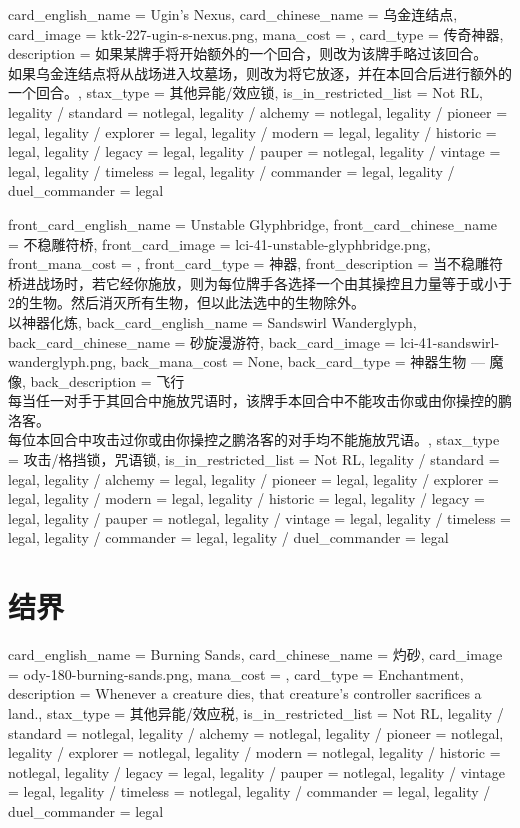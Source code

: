\documentclass[lang = cn, color = black, 10pt]{AllThatStax}
\begin{document}
\card
{
	card_english_name = {Ugin's Nexus},
	card_chinese_name = {乌金连结点},
	card_image = ktk-227-ugin-s-nexus.png,
	mana_cost = ,
	card_type = 传奇神器,
	description = {如果某牌手将开始额外的一个回合，则改为该牌手略过该回合。\\
		如果乌金连结点将从战场进入坟墓场，则改为将它放逐，并在本回合后进行额外的一个回合。},
	stax_type = 其他异能/效应锁,
	is_in_restricted_list = Not RL,
	legality / standard = notlegal,
	legality / alchemy = notlegal,
	legality / pioneer = legal,
	legality / explorer = legal,
	legality / modern = legal,
	legality / historic = legal,
	legality / legacy = legal,
	legality / pauper = notlegal,
	legality / vintage = legal,
	legality / timeless = legal,
	legality / commander = legal,
	legality / duel_commander = legal
}

\mfcard
{
	front_card_english_name = {Unstable Glyphbridge},
	front_card_chinese_name = {不稳雕符桥},
	front_card_image = lci-41-unstable-glyphbridge.png,
	front_mana_cost = ,
	front_card_type = 神器,
	front_description = {当不稳雕符桥进战场时，若它经你施放，则为每位牌手各选择一个由其操控且力量等于或小于2的生物。然后消灭所有生物，但以此法选中的生物除外。\\
		以神器化炼},
	back_card_english_name = {Sandswirl Wanderglyph},
	back_card_chinese_name = {砂旋漫游符},
	back_card_image = lci-41-sandswirl-wanderglyph.png,
	back_mana_cost = None,
	back_card_type = 神器生物 — 魔像,
	back_description = {飞行\\
		每当任一对手于其回合中施放咒语时，该牌手本回合中不能攻击你或由你操控的鹏洛客。\\
		每位本回合中攻击过你或由你操控之鹏洛客的对手均不能施放咒语。},
	stax_type = 攻击/格挡锁，咒语锁,
	is_in_restricted_list = Not RL,
	legality / standard = legal,
	legality / alchemy = legal,
	legality / pioneer = legal,
	legality / explorer = legal,
	legality / modern = legal,
	legality / historic = legal,
	legality / legacy = legal,
	legality / pauper = notlegal,
	legality / vintage = legal,
	legality / timeless = legal,
	legality / commander = legal,
	legality / duel_commander = legal
}

\section{结界}

\card
{
	card_english_name = {Burning Sands},
	card_chinese_name = {灼砂},
	card_image = ody-180-burning-sands.png,
	mana_cost = ,
	card_type = Enchantment,
	description = {Whenever a creature dies, that creature's controller sacrifices a land.},
	stax_type = 其他异能/效应税,
	is_in_restricted_list = Not RL,
	legality / standard = notlegal,
	legality / alchemy = notlegal,
	legality / pioneer = notlegal,
	legality / explorer = notlegal,
	legality / modern = notlegal,
	legality / historic = notlegal,
	legality / legacy = legal,
	legality / pauper = notlegal,
	legality / vintage = legal,
	legality / timeless = notlegal,
	legality / commander = legal,
	legality / duel_commander = legal
}
\end{document}
